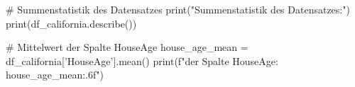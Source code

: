 # Summenstatistik des Datensatzes
print("Summenstatistik des Datensatzes:")
print(df_california.describe())

# Mittelwert der Spalte HouseAge
house_age_mean = df_california['HouseAge'].mean()
print(f"\nMittelwert der Spalte HouseAge: {house_age_mean:.6f}")